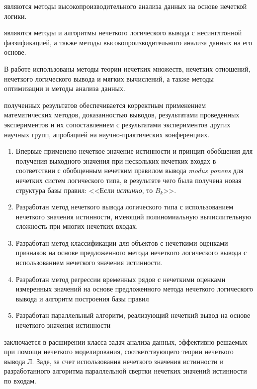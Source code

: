 {\researchObject} являются методы высокопроизводительного анализа данных на основе нечеткой логики.

{\researchSubject} являются методы и алгоритмы нечеткого логического вывода с несинглтонной фаззификацией, а также методы высокопроизводительного анализа данных на его основе.

{\methods} В работе использованы методы теории нечетких множеств, нечетких отношений, нечеткого логического вывода и мягких вычислений, а также методы оптимизации и методы анализа данных.

{\reliability} полученных результатов обеспечивается корректным применением математических методов, доказанностью выводов, результатами проведенных экспериментов и их сопоставлением с результатами экспериментов других научных групп, апробацией на научно-практических конференциях.

{\novelty}
\begin{enumerate}[beginpenalty=10000] %
	\item Впервые применено нечеткое значение истинности и принцип обобщения для получения выходного значения при нескольких нечетких входах в соответствии с обобщенным нечетким правилом вывода \textit{modus ponens} для нечетких систем логического типа, в результате чего была получена новая структура базы правил: <<Если \textit{истинно}, то $B_k$>>.
	\item Разработан метод нечеткого вывода логического типа с использованием нечеткого значения истинности, имеющий полиномиальную вычислительную сложность при многих нечетких входах.
	\item Разработан метод классификации для объектов с нечеткими оценками признаков на основе предложенного метода нечеткого логического вывода с использованием нечеткого значения истинности.
	\item Разработан метод регрессии временных рядов с нечеткими оценками измеренных значений на основе предложенного метода нечеткого логического вывода и алгоритм построения базы правил %
	\item Разработан параллельный алгоритм, реализующий нечеткий вывод на основе нечеткого значения истинности %
\end{enumerate}

{\theoreticalValue} заключается в расширении класса задач анализа данных, эффективно решаемых при помощи нечеткого моделирования, соответствующего теории нечеткого вывода Л. Заде, за счет использования нечеткого значения истинности и разработанного алгоритма параллельной свертки нечетких значений истинности по входам.

